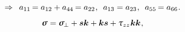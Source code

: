 {\nopagebreak\vspace{-0.25em}
\begin{equation*}
\Rightarrow \hspace{.5em}
a_{11} \hspace{-.2ex} = a_{12} + a_{44} \hspace{-.2ex} = a_{22}
\hspace{.1ex} ,
\hspace{.5em}
a_{13} = a_{23}
\hspace{.1ex} ,
\hspace{.5em}
a_{55} \hspace{-.2ex} = a_{66}
\hspace{.1ex} .
\end{equation*}


\nopagebreak
\begin{equation}\label{stress tensor for a transversely isotropic material}
\linearstress
= \withtheindexofperpendicularity{\linearstress}
+ \bm{s} \bm{k}
+ \bm{k} \bm{s}
+ \cauchystresscomponents{zz} \hspace{.1ex} \bm{k} \bm{k}
\hspace{.1ex} ,
\end{equation}

\noindent
{}

}

